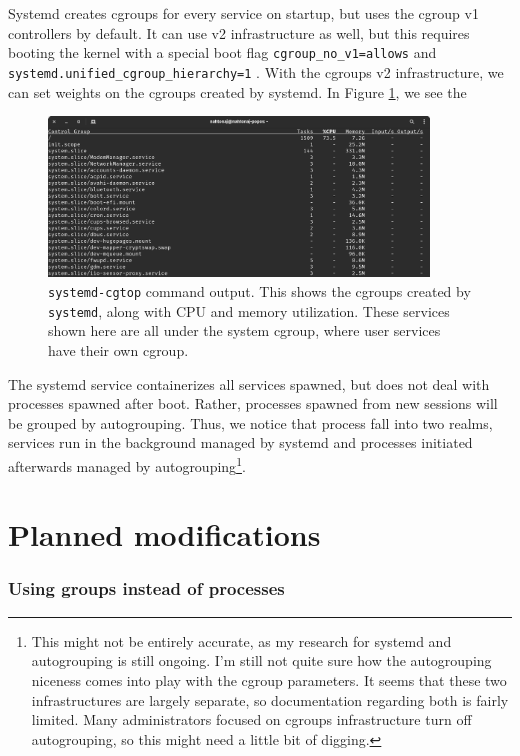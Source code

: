 \documentclass[12pt]{article}
\begin{document}
Systemd creates cgroups for every service on startup, but uses the cgroup v1 controllers by default. It can use v2 infrastructure as well, but this requires booting the kernel with a special boot flag \texttt{cgroup\_no\_v1=allows} and \texttt{systemd.unified\_cgroup\_hierarchy=1} \cite{CgroupsArchWiki}. With the cgroups v2 infrastructure, we can set weights on the cgroups created by systemd. In Figure \ref{fig:systemd-cgtop}, we see the

\begin{figure}
    \centering
    \includegraphics[width=0.9\textwidth]{images/systemd-cgtop.png}
    \caption{\texttt{systemd-cgtop} command output. This shows the cgroups created by \texttt{systemd}, along with CPU and memory utilization. These services shown here are all under the system cgroup, where user services have their own cgroup.}    
    \label{fig:systemd-cgtop}
\end{figure}

The systemd service containerizes all services spawned, but does not deal with processes spawned after boot. Rather, processes spawned from new sessions will be grouped by autogrouping. Thus, we notice that process fall into two realms, services run in the background managed by systemd and processes initiated afterwards managed by autogrouping\footnote{This might not be entirely accurate, as my research for systemd and autogrouping is still ongoing. I'm still not quite sure how the autogrouping niceness comes into play with the cgroup parameters. It seems that these two infrastructures are largely separate, so documentation regarding both is fairly limited. Many administrators focused on cgroups infrastructure turn off autogrouping, so this might need a little bit of digging.}. 

\section*{Planned modifications}

\subsubsection*{Using groups instead of processes}
\end{document}
